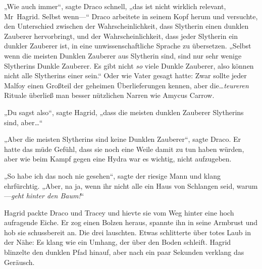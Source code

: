 „Wie auch immer“, sagte Draco schnell, „das ist nicht wirklich relevant, Mr~Hagrid. Selbst wenn—“ Draco arbeitete in seinem Kopf herum und versuchte, den Unterschied zwischen der Wahrscheinlichkeit, dass Slytherin einen dunklen Zauberer hervorbringt, und der Wahrscheinlichkeit, dass jeder Slytherin ein dunkler Zauberer ist, in eine unwissenschaftliche Sprache zu übersetzen.
„Selbst wenn die meisten Dunklen Zauberer aus Slytherin sind, sind nur sehr wenige Slytherins Dunkle Zauberer. Es gibt nicht \emph{so} viele Dunkle Zauberer, also können nicht alle Slytherins einer sein.“
Oder wie Vater gesagt hatte: Zwar sollte jeder Malfoy einen Großteil der geheimen Überlieferungen kennen, aber die…\emph{teureren} Rituale überließ man besser nützlichen Narren wie Amycus Carrow.

„Du sagst also“, sagte Hagrid, „dass die meisten dunklen Zauberer Slytherins sind, aber…“

„Aber die meisten Slytherins sind keine Dunklen Zauberer“, sagte Draco.
Er hatte das müde Gefühl, dass sie noch eine Weile damit zu tun haben würden, aber wie beim Kampf gegen eine Hydra war es wichtig, nicht aufzugeben.

„So habe ich das noch nie gesehen“, sagte der riesige Mann und klang ehrfürchtig. „Aber, na ja, wenn ihr nicht alle ein Haus von Schlangen seid, warum—\emph{geht hinter den Baum!}“

Hagrid packte Draco und Tracey und hievte sie vom Weg hinter eine hoch aufragende Eiche. Er zog einen Bolzen heraus, spannte ihn in seine Armbrust und hob sie schussbereit an.
Die drei lauschten. Etwas schlitterte über totes Laub in der Nähe: Es klang wie ein Umhang, der über den Boden schleift. Hagrid blinzelte den dunklen Pfad hinauf, aber nach ein paar Sekunden verklang das Geräusch.

